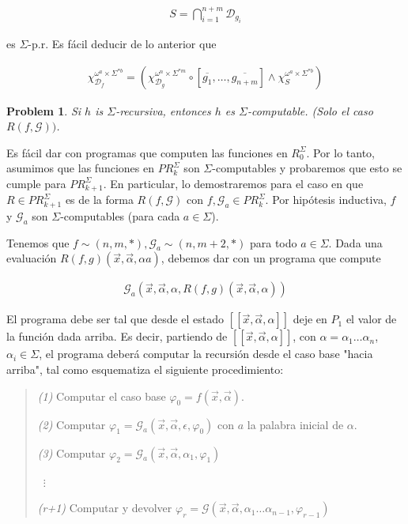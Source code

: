 \documentclass[a4paper, 12pt]{article}
\newtheorem{problem}{Problem}
\newtheorem{problem}{Problem}
\begin{document}
\begin{align*}
    S = \bigcap_{i=1}^{n+m} \mathcal{D}_{g_i}
\end{align*}

es $\Sigma$-p.r. Es fácil deducir de lo anterior que 

\begin{align*}
    \chi_{\mathcal{D}_f}^{\omega^{a} \times \Sigma^{*b} } = \left(
    \chi_{\mathcal{D}_g}^{\omega^{n} \times \Sigma^{*m} } \circ \left[
\overline{g_1}, \ldots, \overline{g_{n+m}} \right]  \land  \chi_{S}^{\omega^{a} \times \Sigma^{*b} } \right) 
\end{align*}

\pagebreak

\begin{problem}
    Si $h$ is $\Sigma$-recursiva, entonces $h$ es $\Sigma$-computable. (Solo el
    caso $R(f, \mathcal{G}))$.
\end{problem}

Es fácil dar con programas que computen las funciones en $R_{0}^{\Sigma}$. Por
lo tanto, asumimos que las funciones en $PR_{k}^{\Sigma}$ son
$\Sigma$-computables y probaremos que esto se cumple para $PR_{k+1}^{\Sigma}$.
En particular, lo demostraremos para el caso en que $R \in PR_{k+1}^{\Sigma}$ es
de la forma $R(f, \mathcal{G})$ con $f, \mathcal{G}_a \in PR_{k}^{\Sigma}$.
Por hipótesis inductiva, $f$ y $\mathcal{G}_a$ son $\Sigma$-computables (para
cada $a \in \Sigma$).

Tenemos que $f \sim (n, m, *), \mathcal{G}_a \sim (n, m + 2, *)$ para todo $a
\in \Sigma$. Dada una evaluación $R(f, g)(\vec{x}, \vec{\alpha}, \alpha a)$,
debemos dar con un programa que compute

\begin{align*}
    \mathcal{G}_a \left( \vec{x}, \vec{\alpha}, \alpha, R(f, g)(\vec{x},
    \vec{\alpha}, \alpha) \right) 
\end{align*}

El programa debe ser tal que desde el estado $[\![ \vec{x}, \vec{\alpha},
\alpha  ]\!]$ deje en $P_1$ el valor de la función dada arriba. Es decir,
partiendo de $[\![ \vec{x}, \vec{\alpha}, \alpha ]\!]$, con $\alpha = \alpha_1
\ldots \alpha_n$, $\alpha_i \in \Sigma$, el programa deberá computar la
recursión desde el caso base "hacia arriba", tal como esquematiza el siguiente
procedimiento:

\begin{quote}
    \textit{(1)} Computar el caso base $\varphi_0 = f(\vec{x}, \vec{\alpha})$. 

    \textit{(2)} Computar $\varphi_1 = \mathcal{G}_a ( \vec{x}, \vec{\alpha}, \epsilon,
    \varphi_0 )$ con $a$ la palabra inicial de $\alpha$.

    \textit{(3)} Computar $\varphi_2 = \mathcal{G}_a \left( \vec{x},
    \vec{\alpha}, \alpha_1, \varphi_1 \right) $ 

       ~$\vdots$

       \textit{(r+1)} Computar y devolver $\varphi_r = \mathcal{G}(\vec{x}, \vec{\alpha},
       \alpha_1\ldots \alpha_{n-1}, \varphi_{r-1})$
\end{quote}
\end{document}
